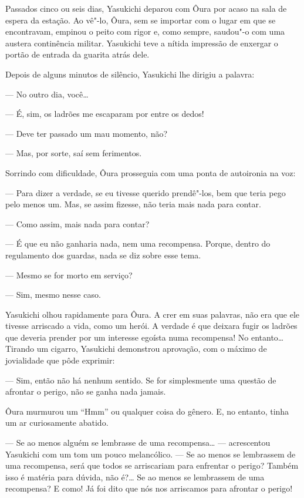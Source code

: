 Passados cinco ou seis dias, Yasukichi deparou com Ôura por acaso na
sala de espera da estação. Ao vê"-lo, Ôura, sem se importar com o lugar
em que se encontravam, empinou o peito com rigor e, como sempre,
saudou"-o com uma austera continência militar. Yasukichi teve a nítida
impressão de enxergar o portão de entrada da guarita atrás dele.

Depois de alguns minutos de silêncio, Yasukichi lhe dirigiu a palavra:

--- No outro dia, você\ldots{}

--- É, sim, os ladrões me escaparam por entre os dedos!

--- Deve ter passado um mau momento, não?

--- Mas, por sorte, saí sem ferimentos.

Sorrindo com dificuldade, Ôura prosseguia com uma ponta de autoironia
na voz:

--- Para dizer a verdade, se eu tivesse querido prendê"-los, bem que teria
pego pelo menos um. Mas, se assim fizesse, não teria mais nada para
contar.

--- Como assim, mais nada para contar?

--- É que eu não ganharia nada, nem uma recompensa. Porque, dentro do
regulamento dos guardas, nada se diz sobre esse tema.

--- Mesmo se for morto em serviço?

--- Sim, mesmo nesse caso.

Yasukichi olhou rapidamente para Ôura. A crer em suas palavras, não era
que ele tivesse arriscado a vida, como um herói. A verdade é que
deixara fugir os ladrões que deveria prender por um interesse egoísta
numa recompensa! No entanto\ldots{} Tirando um cigarro, Yasukichi demonstrou
aprovação, com o máximo de jovialidade que pôde exprimir:

--- Sim, então não há nenhum sentido. Se for simplesmente uma questão de
afrontar o perigo, não se ganha nada jamais.

Ôura murmurou um ``Hmm'' ou qualquer coisa do gênero. E, no entanto, tinha
um ar curiosamente abatido.

--- Se ao menos alguém se lembrasse de uma recompensa\ldots{} --- acrescentou
Yasukichi com um tom um pouco melancólico. --- Se ao menos se lembrassem
de uma recompensa, será que todos se arriscariam para enfrentar o
perigo? Também isso é matéria para dúvida, não é?\ldots{} Se ao menos se
lembrassem de uma recompensa? E como! Já foi dito que nós nos
arriscamos para afrontar o perigo!

